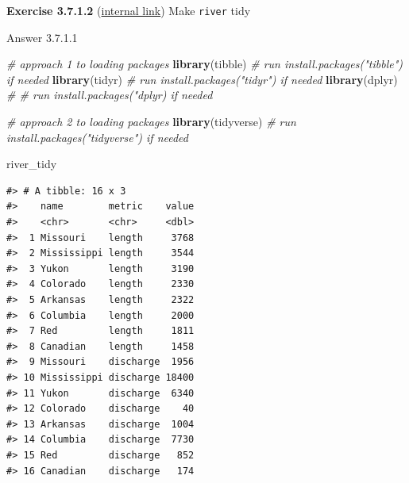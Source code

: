 \documentclass[
]{book}
\newenvironment{Shaded}{\begin{snugshade}}{\end{snugshade}}
\newcommand{\CommentTok}[1]{\textcolor[rgb]{0.56,0.35,0.01}{\textit{#1}}}
\newcommand{\DataTypeTok}[1]{\textcolor[rgb]{0.13,0.29,0.53}{#1}}
\newcommand{\KeywordTok}[1]{\textcolor[rgb]{0.13,0.29,0.53}{\textbf{#1}}}
\newcommand{\NormalTok}[1]{#1}
\newcommand{\OperatorTok}[1]{\textcolor[rgb]{0.81,0.36,0.00}{\textbf{#1}}}
\newcommand{\StringTok}[1]{\textcolor[rgb]{0.31,0.60,0.02}{#1}}
\begin{document}
\textbf{Exercise 3.7.1.2} (\protect\hyperlink{ex-set14}{internal link})
Make \texttt{river} tidy

Answer 3.7.1.1

\begin{Shaded}
\begin{Highlighting}[]
\CommentTok{# approach 1 to loading packages}
\KeywordTok{library}\NormalTok{(tibble) }\CommentTok{# run install.packages("tibble") if needed}
\KeywordTok{library}\NormalTok{(tidyr) }\CommentTok{# run install.packages("tidyr") if needed}
\KeywordTok{library}\NormalTok{(dplyr) }\CommentTok{# # run install.packages("dplyr) if needed}
\end{Highlighting}
\end{Shaded}

\begin{Shaded}
\begin{Highlighting}[]
\CommentTok{# approach 2 to loading packages}
\KeywordTok{library}\NormalTok{(tidyverse) }\CommentTok{# run install.packages("tidyverse") if needed}
\end{Highlighting}
\end{Shaded}

\begin{Shaded}
\end{Shaded}

\begin{Shaded}
\begin{Highlighting}[]
\NormalTok{river_tidy}
\end{Highlighting}
\end{Shaded}

\begin{verbatim}
#> # A tibble: 16 x 3
#>    name        metric    value
#>    <chr>       <chr>     <dbl>
#>  1 Missouri    length     3768
#>  2 Mississippi length     3544
#>  3 Yukon       length     3190
#>  4 Colorado    length     2330
#>  5 Arkansas    length     2322
#>  6 Columbia    length     2000
#>  7 Red         length     1811
#>  8 Canadian    length     1458
#>  9 Missouri    discharge  1956
#> 10 Mississippi discharge 18400
#> 11 Yukon       discharge  6340
#> 12 Colorado    discharge    40
#> 13 Arkansas    discharge  1004
#> 14 Columbia    discharge  7730
#> 15 Red         discharge   852
#> 16 Canadian    discharge   174
\end{verbatim}

  
\end{document}
